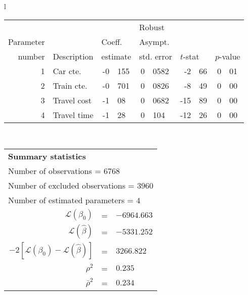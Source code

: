   \begin{tabular}{l}
\begin{tabular}{rlr@{.}lr@{.}lr@{.}lr@{.}l}
         &                       &   \multicolumn{2}{l}{}    & \multicolumn{2}{l}{Robust}  &     \multicolumn{4}{l}{}   \\
Parameter &                       &   \multicolumn{2}{l}{Coeff.}      & \multicolumn{2}{l}{Asympt.}  &     \multicolumn{4}{l}{}   \\
number &  Description                     &   \multicolumn{2}{l}{estimate}      & \multicolumn{2}{l}{std. error}  &   \multicolumn{2}{l}{$t$-stat}  &   \multicolumn{2}{l}{$p$-value}   \\

\hline

1 & Car cte. & -0&155 & 0&0582 & -2&66 & 0&01\\
2 & Train cte. & -0&701 & 0&0826 & -8&49 & 0&00\\
3 & Travel cost & -1&08 & 0&0682 & -15&89 & 0&00\\
4 & Travel time & -1&28 & 0&104 & -12&26 & 0&00\\
\hline
\end{tabular}
\\
\begin{tabular}{rcl}
\multicolumn{3}{l}{\bf Summary statistics}\\
\multicolumn{3}{l}{ Number of observations = $6768$} \\
\multicolumn{3}{l}{ Number of excluded observations = $3960$} \\
\multicolumn{3}{l}{ Number of estimated  parameters = $4$} \\
 $\mathcal{L}(\beta_0)$ &=&  $-6964.663$ \\
 $\mathcal{L}(\hat{\beta})$ &=& $-5331.252 $  \\
 $-2[\mathcal{L}(\beta_0) -\mathcal{L}(\hat{\beta})]$ &=& $3266.822$ \\
    $\rho^2$ &=&   $0.235$ \\
    $\bar{\rho}^2$ &=&    $0.234$ \\
\end{tabular}
  \end{tabular}
